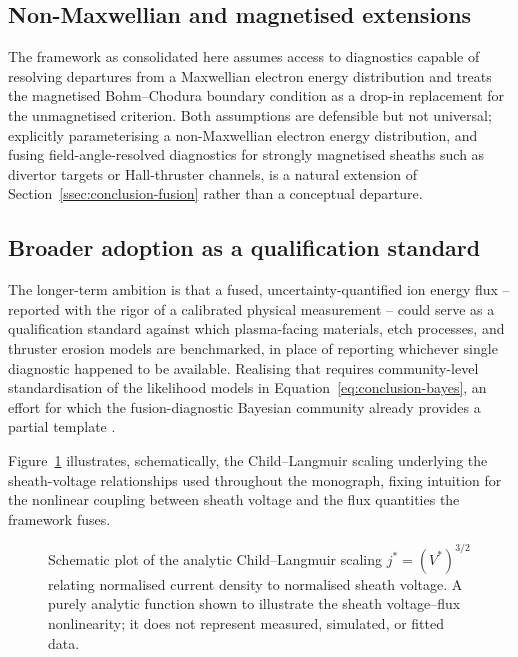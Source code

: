 \subsection{Non-Maxwellian and magnetised extensions}
\label{ssec:conclusion-nonmaxwellian}

The framework as consolidated here assumes access to diagnostics capable of resolving departures from a Maxwellian electron energy distribution and treats the magnetised Bohm--Chodura boundary condition as a drop-in replacement for the unmagnetised criterion. Both assumptions are defensible but not universal; explicitly parameterising a non-Maxwellian electron energy distribution, and fusing field-angle-resolved diagnostics for strongly magnetised sheaths such as divertor targets or Hall-thruster channels, is a natural extension of Section~\ref{ssec:conclusion-fusion} rather than a conceptual departure.

\subsection{Broader adoption as a qualification standard}
\label{ssec:conclusion-standard}

The longer-term ambition is that a fused, uncertainty-quantified ion energy flux -- reported with the rigor of a calibrated physical measurement -- could serve as a qualification standard against which plasma-facing materials, etch processes, and thruster erosion models are benchmarked, in place of reporting whichever single diagnostic happened to be available. Realising that requires community-level standardisation of the likelihood models in Equation~\eqref{eq:conclusion-bayes}, an effort for which the fusion-diagnostic Bayesian community already provides a partial template \cite{ref0710,ref0711}.

Figure~\ref{fig:childlaw} illustrates, schematically, the Child--Langmuir scaling underlying the sheath-voltage relationships used throughout the monograph, fixing intuition for the nonlinear coupling between sheath voltage and the flux quantities the framework fuses.

\begin{figure}[htbp]
\centering
{}
\caption{Schematic plot of the analytic Child--Langmuir scaling $j^{*} = \left(V^{*}\right)^{3/2}$ relating normalised current density to normalised sheath voltage. A purely analytic function shown to illustrate the sheath voltage--flux nonlinearity; it does not represent measured, simulated, or fitted data.}
\label{fig:childlaw}
\end{figure}


